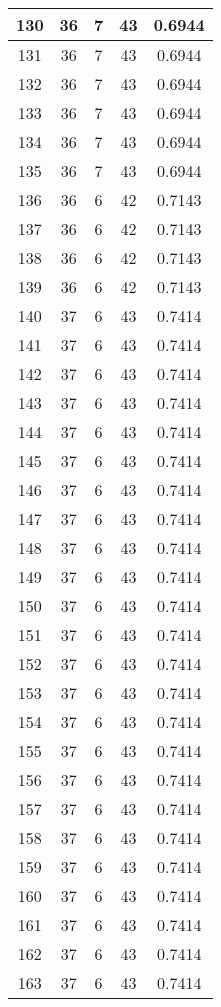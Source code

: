 \documentclass[letterpaper, 12pt]{article}
\begin{document}
\begin{longtable}{|c|c|c|c|c|}
\hline
130 & 36 & 7 & 43 & 0.6944 \\
\hline
131 & 36 & 7 & 43 & 0.6944 \\
\hline
132 & 36 & 7 & 43 & 0.6944 \\
\hline
133 & 36 & 7 & 43 & 0.6944 \\
\hline
134 & 36 & 7 & 43 & 0.6944 \\
\hline
135 & 36 & 7 & 43 & 0.6944 \\
\hline
136 & 36 & 6 & 42 & 0.7143 \\
\hline
137 & 36 & 6 & 42 & 0.7143 \\
\hline
138 & 36 & 6 & 42 & 0.7143 \\
\hline
139 & 36 & 6 & 42 & 0.7143 \\
\hline
140 & 37 & 6 & 43 & 0.7414 \\
\hline
141 & 37 & 6 & 43 & 0.7414 \\
\hline
142 & 37 & 6 & 43 & 0.7414 \\
\hline
143 & 37 & 6 & 43 & 0.7414 \\
\hline
144 & 37 & 6 & 43 & 0.7414 \\
\hline
145 & 37 & 6 & 43 & 0.7414 \\
\hline
146 & 37 & 6 & 43 & 0.7414 \\
\hline
147 & 37 & 6 & 43 & 0.7414 \\
\hline
148 & 37 & 6 & 43 & 0.7414 \\
\hline
149 & 37 & 6 & 43 & 0.7414 \\
\hline
150 & 37 & 6 & 43 & 0.7414 \\
\hline
151 & 37 & 6 & 43 & 0.7414 \\
\hline
152 & 37 & 6 & 43 & 0.7414 \\
\hline
153 & 37 & 6 & 43 & 0.7414 \\
\hline
154 & 37 & 6 & 43 & 0.7414 \\
\hline
155 & 37 & 6 & 43 & 0.7414 \\
\hline
156 & 37 & 6 & 43 & 0.7414 \\
\hline
157 & 37 & 6 & 43 & 0.7414 \\
\hline
158 & 37 & 6 & 43 & 0.7414 \\
\hline
159 & 37 & 6 & 43 & 0.7414 \\
\hline
160 & 37 & 6 & 43 & 0.7414 \\
\hline
161 & 37 & 6 & 43 & 0.7414 \\
\hline
162 & 37 & 6 & 43 & 0.7414 \\
\hline
163 & 37 & 6 & 43 & 0.7414 \\

\end{longtable}
\end{document}
